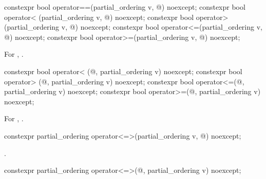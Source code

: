 %
%
%
%
%
\begin{itemdecl}
constexpr bool operator==(partial_ordering v, @\unspec@) noexcept;
constexpr bool operator< (partial_ordering v, @\unspec@) noexcept;
constexpr bool operator> (partial_ordering v, @\unspec@) noexcept;
constexpr bool operator<=(partial_ordering v, @\unspec@) noexcept;
constexpr bool operator>=(partial_ordering v, @\unspec@) noexcept;
\end{itemdecl}

\begin{itemdescr}
\pnum
\returns
For , .
\end{itemdescr}

%
%
%
%
\begin{itemdecl}
constexpr bool operator< (@\unspec@, partial_ordering v) noexcept;
constexpr bool operator> (@\unspec@, partial_ordering v) noexcept;
constexpr bool operator<=(@\unspec@, partial_ordering v) noexcept;
constexpr bool operator>=(@\unspec@, partial_ordering v) noexcept;
\end{itemdecl}

\begin{itemdescr}
\pnum
\returns
For , .
\end{itemdescr}

%
\begin{itemdecl}
constexpr partial_ordering operator<=>(partial_ordering v, @\unspec@) noexcept;
\end{itemdecl}

\begin{itemdescr}
\pnum
\returns
{}.
\end{itemdescr}

%
\begin{itemdecl}
constexpr partial_ordering operator<=>(@\unspec@, partial_ordering v) noexcept;
\end{itemdecl}


